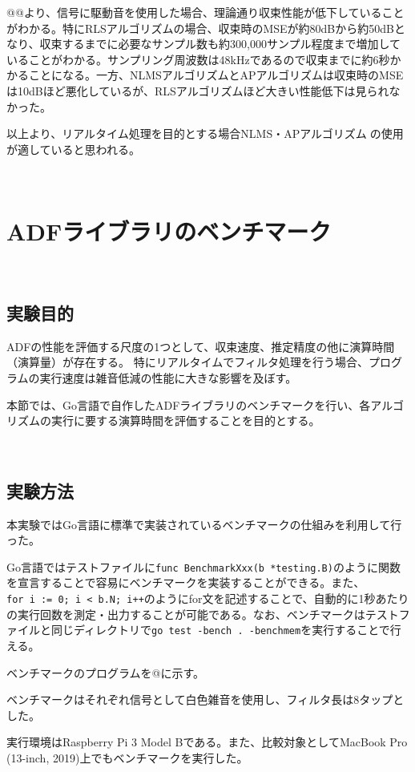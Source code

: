@@より、信号に駆動音を使用した場合、理論通り収束性能が低下していることがわかる。特にRLSアルゴリズムの場合、収束時のMSEが約80dBから約50dBとなり、収束するまでに必要なサンプル数も約300,000サンプル程度まで増加していることがわかる。サンプリング周波数は48kHzであるので収束までに約6秒かかることになる。一方、NLMSアルゴリズムとAPアルゴリズムは収束時のMSEは10dBほど悪化しているが、RLSアルゴリズムほど大きい性能低下は見られなかった。

以上より、リアルタイム処理を目的とする場合NLMS・APアルゴリズムの使用が適していると思われる。

\
\section{ADFライブラリのベンチマーク}\label{benchmark}

\
\subsection{実験目的}\label{purpose-benchmark}

ADFの性能を評価する尺度の1つとして、収束速度、推定精度の他に演算時間（演算量）が存在する。
特にリアルタイムでフィルタ処理を行う場合、プログラムの実行速度は雑音低減の性能に大きな影響を及ぼす。

本節では、Go言語で自作したADFライブラリのベンチマークを行い、各アルゴリズムの実行に要する演算時間を評価することを目的とする。

\
\subsection{実験方法}\label{instruction-benchmark}

本実験ではGo言語に標準で実装されているベンチマークの仕組みを利用して行った。

Go言語ではテストファイルに\texttt{func\ BenchmarkXxx(b\ *testing.B)}のように関数を宣言することで容易にベンチマークを実装することができる。また、\texttt{for\ i\ :=\ 0;\ i\ \textless{}\ b.N;\ i++}のようにfor文を記述することで、自動的に1秒あたりの実行回数を測定・出力することが可能である。なお、ベンチマークはテストファイルと同じディレクトリで\texttt{go\ test\ -bench\ .\ -benchmem}を実行することで行える。

ベンチマークのプログラムを@に示す。

ベンチマークはそれぞれ信号として白色雑音を使用し、フィルタ長は8タップとした。

実行環境はRaspberry Pi 3 Model Bである。また、比較対象としてMacBook Pro
(13-inch, 2019)上でもベンチマークを実行した。

